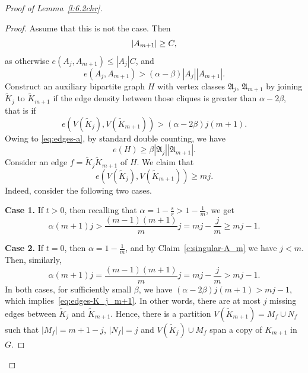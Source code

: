 \documentclass[reqno, 12pt]{amsart}
\numberwithin{equation}{section}
\numberwithin{figure}{section}
\theoremstyle{plain}
\theoremstyle{definition}
\def\fA{\mathfrak{A}}
\begin{document}
\begin{proof}[Proof of Lemma~\ref{l:6.2chr}]
        \begin{proof}
            Assume that this is not the case. Then 
            \begin{equation}\label{eq:A_{m+1}}
                |A_{m+1}|\geq C,
            \end{equation}
            as otherwise $e(A_j,A_{m+1})\leq|A_j|C$, and
            \begin{equation}
            \label{eq:edges-a}
                e(A_j,A_{m+1})> (\alpha-\beta) |A_j||A_{m+1}|.
            \end{equation}
            Construct an auxiliary bipartite graph $H$ with vertex classes $\fA_j$, $\fA_{m+1}$ by joining $\tilde K_j$ to $\tilde K_{m+1}$ if the edge density between those cliques is greater than $\alpha-2\beta$, that is if
            \[e(V(\tilde K_j), V(\tilde K_{m+1}))> (\alpha-2\beta)j(m+1).\]
            Owing to \eqref{eq:edges-a}, by standard double counting, we have 
            \[e(H)\geq \beta |\fA_j||\fA_{m+1}|.\]
            Consider an edge $f=\tilde K_j \tilde K_{m+1}$ of $H$. We claim that 
            \begin{equation}
            \label{eq:edges-K_j_m+1}
            e(V(\tilde K_j), V(\tilde K_{m+1}))\geq mj.
            \end{equation} 
            Indeed, consider the following two cases.
            
            \textbf{Case 1.} If $t>0$, then recalling that $\alpha=1-\frac{s}{r}>1-\frac1m$, we get
            \[\alpha (m+1)j > \frac{(m-1)(m+1)}{m}j=mj-\frac{j}{m}\geq mj-1.\]
            
            \textbf{Case 2.} If $t=0$, then $\alpha=1-\frac1m$, and by Claim~\ref{c:singular-A_m} we have $j<m$. Then, similarly, \[\alpha (m+1)j = \frac{(m-1)(m+1)}{m}j=mj-\frac{j}{m}> mj-1.\]
            In both cases, for sufficiently small $\beta$, we have $(\alpha-2\beta)j(m+1) > mj-1$, which implies~\eqref{eq:edges-K_j_m+1}.
            In other words, there are at most $j$ missing edges between $\tilde K_j$ and $\tilde K_{m+1}$. Hence, there is a partition $V(\tilde K_{m+1})=M_f\cup N_f$ such that $|M_f|=m+1-j$, $|N_f|=j$ and $V(\tilde K_j)\cup M_f$ span a copy of $K_{m+1}$ in $G$. 
            

\end{proof}
\end{proof}
\end{document}
